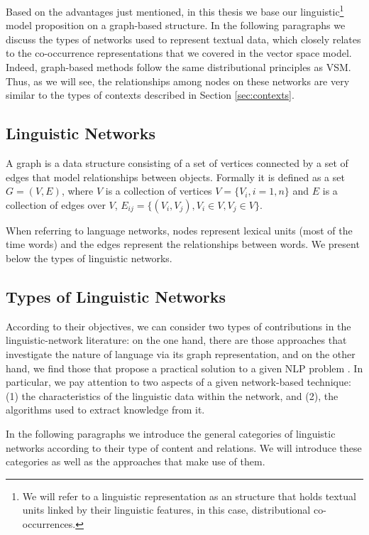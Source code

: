 Based on the  advantages just mentioned, in this thesis we base our linguistic\footnote{We will refer to a linguistic representation as an structure that holds textual units linked by their linguistic features, in this case, distributional co-occurrences.} model proposition on a graph-based structure. In the following paragraphs we discuss the types of networks used to represent textual data, which closely relates to the co-occurrence representations that we covered in the vector space model. Indeed, graph-based methods follow the same distributional principles as VSM. Thus, as we will see, the relationships among nodes on these networks are very similar to the types of contexts described in Section \ref{sec:contexts}.


\subsection{Linguistic Networks}
A graph is a data structure consisting of a set of vertices connected by
a set of edges that  model relationships between objects.
Formally it is defined as a set $G=(V,E)$, where $V$ is a
collection of vertices $V=\{V_i,i=1,n\}$ and $E$ is a collection of
edges over $V$, $E_{ij}=\{(V_i,V_j),V_i \in V, V_j \in V\}$. 

When referring to language networks, nodes represent lexical units (most of the time words) and the edges represent the relationships between words. We present below the types of linguistic networks. 

\subsection{Types of Linguistic Networks}

According to their objectives, we can consider two types of contributions in the linguistic-network literature: on the one hand, there are those approaches that investigate the nature of language via its graph representation, and on the other hand, we find those that propose a practical solution to a given NLP problem  \cite{Choudhury2009}. In particular, we pay attention to two aspects of a given network-based technique: (1) the  characteristics of the linguistic data within the network, and (2), the  algorithms used to extract knowledge from it.


In the following paragraphs we introduce the general categories of linguistic networks according to their type of content and relations. We will introduce these categories as well as the  approaches that make use of them.


